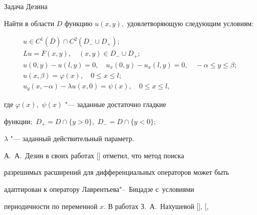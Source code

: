 \smallskip



{\small\sc Задача Дезина} \it

Найти в области $D$ функцию $u(x,y),$ удовлетворяющую следующим условиям{\/\rm:}

\begin{gather}

\label{K:eq2}

u \in C^1( \overline{D} ) \cap  C^2(D_{-}\cup D_{+});

\\

\label{K:eq3}

Lu =F(x,y),\quad  (x,y)\in D_{-}\cup D_{+};

\\

\label{K:eq5}

u(0, y)-u(l, y)=0, \quad u_{x}(0, y)-u_{x}(l, y)=0,\quad -\alpha \le y \le \beta;

\\

\label{K:eq5}

u(x,\beta)=\varphi(x), \quad 0\le x \le l;

\\

\label{K:eq6}

u_{y}(x,-\alpha)-\lambda u(x, 0)=\psi(x),\quad 0\le x \le l,

\end{gather}

где $\varphi(x),$ $\psi(x)$ "--- заданные достаточно гладкие

функции$;$  $D_{+}= D \cap \{y > 0 \},$ $D_{-}= D \cap \{y < 0 \} ;$

$\lambda$ "--- заданный действительный параметр\rm.



\rm





\smallskip



А.~А.~Дезин в своих работах [] отметил, что метод поиска

разрешимых расширений для дифференциальных операторов может быть

адаптирован к оператору  Лаврентьева"--~Бицадзе с~условиями

периодичности по переменной $x$. В работах З.~А.~Нахушевой  [], [,

